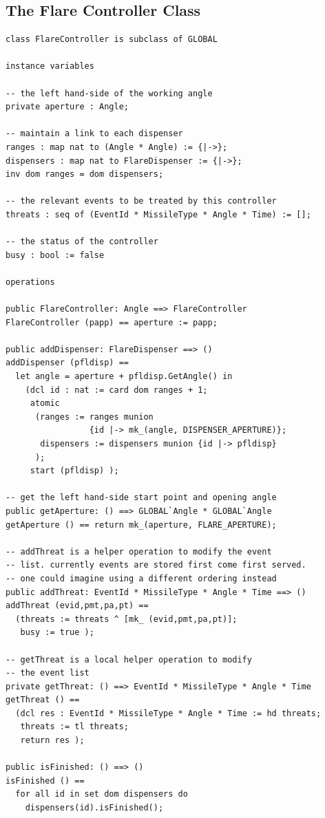 \documentclass{overturerepchap}
\begin{document}
\subsection{The Flare Controller Class}

\begin{lstlisting}
class FlareController is subclass of GLOBAL

instance variables

-- the left hand-side of the working angle
private aperture : Angle;

-- maintain a link to each dispenser
ranges : map nat to (Angle * Angle) := {|->};
dispensers : map nat to FlareDispenser := {|->};
inv dom ranges = dom dispensers;

-- the relevant events to be treated by this controller
threats : seq of (EventId * MissileType * Angle * Time) := [];

-- the status of the controller
busy : bool := false

operations

public FlareController: Angle ==> FlareController
FlareController (papp) == aperture := papp;

public addDispenser: FlareDispenser ==> ()
addDispenser (pfldisp) ==
  let angle = aperture + pfldisp.GetAngle() in
    (dcl id : nat := card dom ranges + 1;
     atomic
      (ranges := ranges munion 
                 {id |-> mk_(angle, DISPENSER_APERTURE)};
       dispensers := dispensers munion {id |-> pfldisp}
      );
     start (pfldisp) );

-- get the left hand-side start point and opening angle
public getAperture: () ==> GLOBAL`Angle * GLOBAL`Angle
getAperture () == return mk_(aperture, FLARE_APERTURE);

-- addThreat is a helper operation to modify the event
-- list. currently events are stored first come first served.
-- one could imagine using a different ordering instead
public addThreat: EventId * MissileType * Angle * Time ==> ()
addThreat (evid,pmt,pa,pt) ==
  (threats := threats ^ [mk_ (evid,pmt,pa,pt)];
   busy := true );

-- getThreat is a local helper operation to modify 
-- the event list
private getThreat: () ==> EventId * MissileType * Angle * Time
getThreat () ==
  (dcl res : EventId * MissileType * Angle * Time := hd threats;
   threats := tl threats;
   return res );

public isFinished: () ==> ()
isFinished () ==
  for all id in set dom dispensers do
    dispensers(id).isFinished();


\end{lstlisting}
\end{document}
